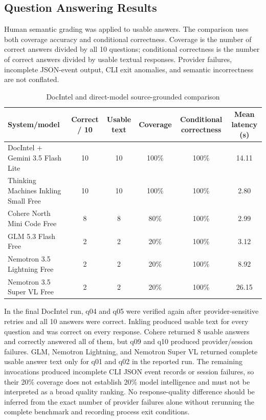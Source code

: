 \documentclass[conference]{IEEEtran}
\begin{document}
\subsection{Question Answering Results}
Human semantic grading was applied to usable answers. The comparison uses both coverage accuracy and conditional correctness. Coverage is the number of correct answers divided by all 10 questions; conditional correctness is the number of correct answers divided by usable textual responses. Provider failures, incomplete JSON-event output, CLI exit anomalies, and semantic incorrectness are not conflated.

\begin{table}[!t]
\centering
\caption{DocIntel and direct-model source-grounded comparison}
\label{tab:model-results}
\small
\setlength{\tabcolsep}{4pt}
\begin{tabular}{lccccc}
\toprule
\rowcolor{docintelLightBlue}
System/model & Correct / 10 & Usable text & Coverage & Conditional correctness & Mean latency (s) \\
\midrule
DocIntel + Gemini 3.5 Flash Lite & 10 & 10 & 100\% & 100\% & 14.11 \\
Thinking Machines Inkling Small Free & 10 & 10 & 100\% & 100\% & 2.80 \\
Cohere North Mini Code Free & 8 & 8 & 80\% & 100\% & 2.99 \\
GLM 5.3 Flash Free & 2 & 2 & 20\% & 100\% & 3.12 \\
Nemotron 3.5 Lightning Free & 2 & 2 & 20\% & 100\% & 8.92 \\
Nemotron 3.5 Super VL Free & 2 & 2 & 20\% & 100\% & 26.15 \\
\bottomrule
\end{tabular}
\end{table}

In the final DocIntel run, q04 and q05 were verified again after provider-sensitive retries and all 10 answers were correct. Inkling produced usable text for every question and was correct on every response. Cohere returned 8 usable answers and correctly answered all of them, but q09 and q10 produced provider/session failures. GLM, Nemotron Lightning, and Nemotron Super VL returned complete usable answer text only for q01 and q02 in the reported run. The remaining invocations produced incomplete CLI JSON event records or session failures, so their 20\% coverage does not establish 20\% model intelligence and must not be interpreted as a broad quality ranking. No response-quality difference should be inferred from the exact number of provider failures alone without rerunning the complete benchmark and recording process exit conditions.
\end{document}
